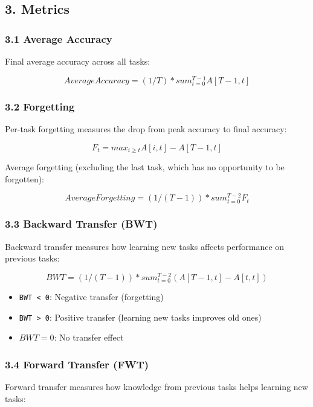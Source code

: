 \documentclass[11pt]{article}
\begin{document}
\subsection{3. Metrics}

\subsubsection{3.1 Average Accuracy}

Final average accuracy across all tasks:

\[
Average Accuracy = (1/T) * sum_{t=0}^{T-1} A[T-1, t]
\]

\subsubsection{3.2 Forgetting}

Per-task forgetting measures the drop from peak accuracy to final accuracy:

\[
F_t = max_{i \ge  t} A[i, t] - A[T-1, t]
\]

Average forgetting (excluding the last task, which has no opportunity to be forgotten):

\[
Average Forgetting = (1/(T-1)) * sum_{t=0}^{T-2} F_t
\]

\subsubsection{3.3 Backward Transfer (BWT)}

Backward transfer measures how learning new tasks affects performance on previous tasks:

\[
BWT = (1/(T-1)) * sum_{t=0}^{T-2} (A[T-1, t] - A[t, t])
\]

\begin{itemize}[leftmargin=*]
\item \texttt{BWT < 0}: Negative transfer (forgetting)
\item \texttt{BWT > 0}: Positive transfer (learning new tasks improves old ones)
\item $BWT = 0$: No transfer effect
\end{itemize}

\subsubsection{3.4 Forward Transfer (FWT)}

Forward transfer measures how knowledge from previous tasks helps learning new tasks:
\end{document}
